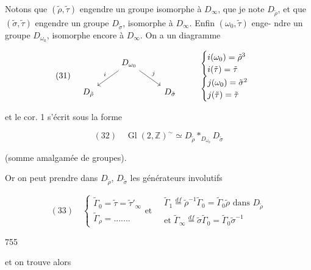 Notons que $(\tilde{\rho}, \tilde{\tau})$ engendre un groupe
isomorphe à $D_\infty$, que je note $D_{\tilde{\rho}}$,
et que $(\tilde{\sigma}, \tilde{\tau})$ engendre un groupe $D_{\tilde{\sigma}}$,
isomorphe à $D_\infty$. Enfin $(\omega_0, \tilde{\tau})$ enge-
ndre un groupe $D_{\omega_0}$, isomorphe encore
à $D_\infty$. On a un diagramme

$$
(31) \quad 
\begin{tikzcd}
& D_{\omega_0} \ar[dl, "i"'] \ar[dr, "j"] & \\
D_{\tilde{\rho}} & & D_{\tilde{\sigma}}
\end{tikzcd}
\qquad
\begin{array}{l}
\begin{cases} i(\omega_0) = \tilde{\rho}^3 \\ i(\tilde{\tau}) = \tilde{\tau} \end{cases} \\
\begin{cases} j(\omega_0) = \tilde{\sigma}^2 \\ j(\tilde{\tau}) = \tilde{\tau} \end{cases}
\end{array}
$$

et le cor. 1 s'écrit sous la forme

$$
(32) \quad \operatorname{Gl}(2, \mathbb{Z})^\sim \simeq D_{\tilde{\rho}} *_{D_{\omega_0}} D_{\tilde{\sigma}}
$$

(somme amalgamée de groupes).

Or on peut prendre dans $D_{\tilde{\rho}}$, $D_{\tilde{\sigma}}$ les
générateurs involutifs

$$
(33) \quad \begin{cases}
\tilde{\Gamma}_0 = \tilde{\tau} = \tilde{\tau}'_\infty \\
\tilde{\Gamma}_\rho = .......
\end{cases}
\text{et} \quad
\begin{matrix}
\tilde{\Gamma}_1 \overset{df}{=} \tilde{\rho}^{-1} \tilde{\Gamma}_0 = \tilde{\Gamma}_0 \tilde{\rho} \text{ dans } D_{\tilde{\rho}} \\
\text{et } \tilde{\Gamma}_\infty \overset{df}{=} \tilde{\sigma} \tilde{\Gamma}_0 = \tilde{\Gamma}_0 \tilde{\sigma}^{-1}
\end{matrix}
$$

\newpage


755

et on trouve alors


